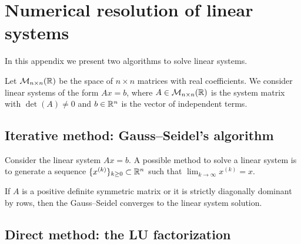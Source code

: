 
\section{Numerical resolution of linear systems} \label{ap:numerical_resolution_linear_systems}

In this appendix we present two algorithms to solve linear systems.

Let $\mathcal{M}_{n \times n}(\mathbb{R})$ be the space of $n \times n$ matrices with
real coefficients. We consider linear systems of the form $A x = b$, where $A
\in \mathcal{M}_{n \times n}(\mathbb{R})$ is the system matrix with $\det(A) \neq 0$
and $b \in \mathbb{R}^n$ is the vector of independent terms. 

\subsection{Iterative method: Gauss--Seidel's algorithm}

Consider the linear system $A x = b$. A possible method to solve a linear system
is to generate a sequence $\{ x^{(k)} \}_{k \geq 0} \subset \mathbb{R}^n$ such that
$\lim_{k \to \infty} x^{(k)} = x$.  

\begin{theorem}
    If $A$ is a positive definite symmetric matrix or it is strictly diagonally
    dominant by rows, then the Gauss--Seidel converges to the linear system
    solution.
\end{theorem}

\subsection{Direct method: the LU factorization}